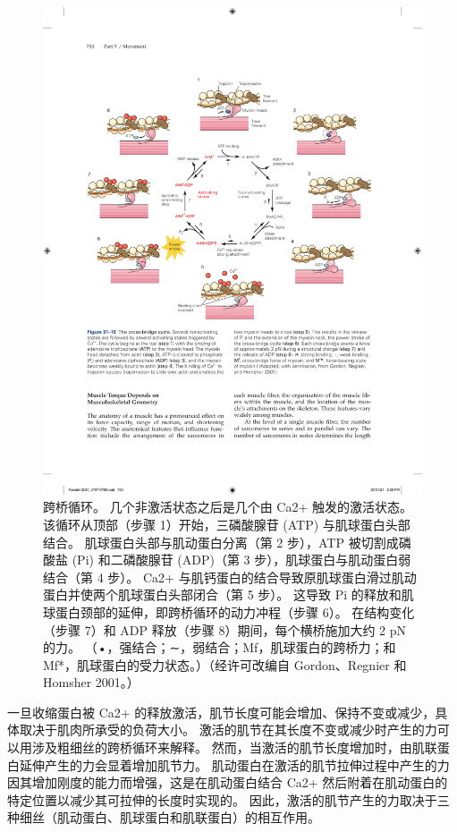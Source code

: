 \begin{figure}[htbp]
	\centering
	\includegraphics[width=0.9\linewidth]{chap31/fig_31_10}
	\caption{跨桥循环。 几个非激活状态之后是几个由 Ca2+ 触发的激活状态。 该循环从顶部（步骤 1）开始，三磷酸腺苷 (ATP) 与肌球蛋白头部结合。 肌球蛋白头部与肌动蛋白分离（第 2 步），ATP 被切割成磷酸盐 (Pi) 和二磷酸腺苷 (ADP)（第 3 步），肌球蛋白与肌动蛋白弱结合（第 4 步）。 Ca2+ 与肌钙蛋白的结合导致原肌球蛋白滑过肌动蛋白并使两个肌球蛋白头部闭合（第 5 步）。 这导致 Pi 的释放和肌球蛋白颈部的延伸，即跨桥循环的动力冲程（步骤 6）。 在结构变化（步骤 7）和 ADP 释放（步骤 8）期间，每个横桥施加大约 2 pN 的力。 （•，强结合；∼，弱结合；Mf，肌球蛋白的跨桥力；和 Mf*，肌球蛋白的受力状态。）（经许可改编自 Gordon、Regnier 和 Homsher 2001。）}
	\label{fig:31_10}
\end{figure}

一旦收缩蛋白被 Ca2+ 的释放激活，肌节长度可能会增加、保持不变或减少，具体取决于肌肉所承受的负荷大小。
激活的肌节在其长度不变或减少时产生的力可以用涉及粗细丝的跨桥循环来解释。
然而，当激活的肌节长度增加时，由肌联蛋白延伸产生的力会显着增加肌节力。
肌动蛋白在激活的肌节拉伸过程中产生的力因其增加刚度的能力而增强，这是在肌动蛋白结合 Ca2+ 然后附着在肌动蛋白的特定位置以减少其可拉伸的长度时实现的。
因此，激活的肌节产生的力取决于三种细丝（肌动蛋白、肌球蛋白和肌联蛋白）的相互作用。


